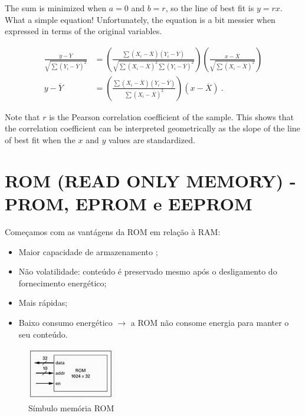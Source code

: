 \documentclass{article}
\begin{document}
The sum is minimized when $a = 0$ and $b = r$, so the line of best fit is
$y = rx$. What a simple equation!
Unfortunately, the equation is a bit messier when expressed in terms of the
original variables.

\begin{align*}
\frac{y - \overline{Y}}{\sqrt{\sum (Y_i - \overline{Y})^2}}
&= \left(
     \frac{\sum (X_i - \overline{X}) (Y_i - \overline{Y})}
          {\sqrt{\sum (X_i - \overline{X})^2 \sum (Y_i - \overline{Y})^2}}
   \right)
   \left(
     \frac{x - \overline{X}}
          {\sqrt{\sum (X_i - \overline{X})^2}}
   \right)\\
y - \overline{Y} &=
\left(
     \frac{\sum (X_i - \overline{X}) (Y_i - \overline{Y})}
          {\sum (X_i - \overline{X})^2}
   \right)
   (x - \overline{X})\ .
\end{align*}

Note that $r$ is the Pearson correlation coefficient of the sample.
This shows that the correlation coefficient can be interpreted geometrically
as the slope of the line of best fit when the $x$ and $y$ values are standardized.
\fi


\section{ROM (READ ONLY MEMORY) - PROM, EPROM e EEPROM}

Começamos com as vantágens da ROM em relação à RAM:
\begin{itemize}
     \item Maior capacidade de armazenamento ;
     \item Não volatilidade: conteúdo é preservado mesmo após o desligamento do fornecimento energético;
     \item Mais rápidas;
     \item Baixo consumo energético $\rightarrow$ a ROM não consome energia para manter o seu conteúdo.
\end{itemize}

\begin{figure}[h!] 
    \centering 
    \includegraphics[width=0.35\textwidth]{simbuloROM.jpg}
    \caption{Símbulo memória ROM} 
    \label{fig:simbuloROM} 
\end{figure}
\end{document}
